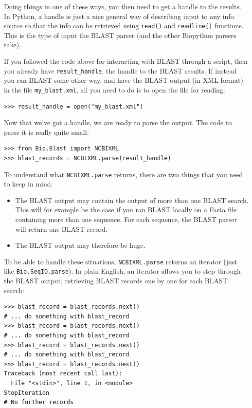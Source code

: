 \documentclass{report}
\begin{document}
Doing things in one of these ways, you then need to get a handle
to the results. In Python, a handle is just a nice general way of
describing input to any info source so that the info can be retrieved
using \verb|read()| and \verb|readline()| functions. This is the type
of input the BLAST parser (and the other Biopython parsers take).

If you followed the code above for interacting with BLAST through a
script, then you already have \verb|result_handle|, the handle to the
BLAST results. If instead you ran BLAST some other way, and have the
BLAST output (in XML format) in the file \verb|my_blast.xml|, all you
need to do is to open the file for reading:

\begin{verbatim}
>>> result_handle = open("my_blast.xml")
\end{verbatim}

Now that we've got a handle, we are ready to parse the output. The
code to parse it is really quite small:

\begin{verbatim}
>>> from Bio.Blast import NCBIXML
>>> blast_records = NCBIXML.parse(result_handle)
\end{verbatim}

To understand what \verb|NCBIXML.parse| returns, there are two things
that you need to keep in mind:
\begin{itemize}
\item The BLAST output may contain the output of more than
one BLAST search. This will for example be the case if you ran BLAST locally
on a Fasta file containing more than one sequence. For each sequence, the
BLAST parser will return one BLAST record.
\item The BLAST output may therefore be huge.
\end{itemize}

To be able to handle these situations, \verb|NCBIXML.parse| returns an
iterator (just like \verb|Bio.SeqIO.parse|). In plain English, an iterator
allows you to step through the BLAST output, retrieving BLAST records one
by one for each BLAST search:

\begin{verbatim}
>>> blast_record = blast_records.next()
# ... do something with blast_record
>>> blast_record = blast_records.next()
# ... do something with blast_record
>>> blast_record = blast_records.next()
# ... do something with blast_record
>>> blast_record = blast_records.next()
Traceback (most recent call last):
  File "<stdin>", line 1, in <module>
StopIteration
# No further records
\end{verbatim}
\end{document}
